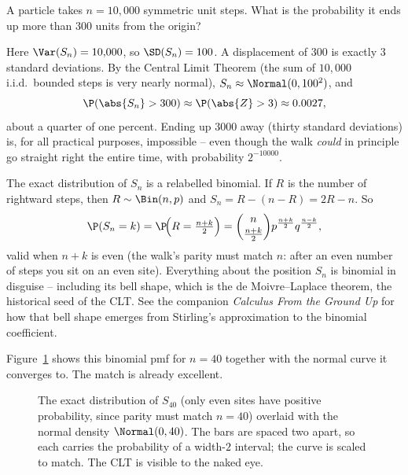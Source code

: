 \begin{example}
\label{ch26:ex-howfar}
A particle takes $n = 10{,}000$ symmetric unit steps. What is the probability
it ends up more than $300$ units from the origin?

Here $\Var(S_n) = 10{,}000$, so $\SD(S_n) = 100$. A displacement of $300$ is
exactly $3$ standard deviations. By the Central Limit Theorem (the sum of
$10{,}000$ i.i.d.\ bounded steps is very nearly normal), $S_n \approx
\Normal(0, 100^2)$, and
\[
  \P(\abs{S_n} > 300) \approx \P(\abs{Z} > 3) \approx 0.0027,
\]
about a quarter of one percent. Ending up $3000$ away (thirty standard
deviations) is, for all practical purposes, impossible -- even though the walk
\emph{could} in principle go straight right the entire time, with probability
$2^{-10000}$.
\end{example}

\begin{connectionbox}
The exact distribution of $S_n$ is a relabelled binomial. If $R$ is the number
of rightward steps, then $R \sim \Bin(n, p)$ and $S_n = R - (n - R) = 2R - n$.
So
\[
  \P(S_n = k) = \P\!\Big(R = \tfrac{n+k}{2}\Big)
  = \binom{n}{\frac{n+k}{2}} p^{\frac{n+k}{2}} q^{\frac{n-k}{2}},
\]
valid when $n + k$ is even (the walk's parity must match $n$: after an even
number of steps you sit on an even site). Everything about the position $S_n$
is binomial in disguise -- including its bell shape, which is the de
Moivre--Laplace theorem, the historical seed of the CLT. See the companion
\emph{Calculus From the Ground Up} for how that bell shape emerges from
Stirling's approximation to the binomial coefficient.
\end{connectionbox}

Figure~\ref{ch26:fig-pmf} shows this binomial pmf for $n = 40$ together with
the normal curve it converges to. The match is already excellent.

\begin{figure}[H]
\centering
{}
\caption{The exact distribution of $S_{40}$ (only even sites have positive
probability, since parity must match $n=40$) overlaid with the normal density
$\Normal(0,40)$. The bars are spaced two apart, so each carries the
probability of a width-$2$ interval; the curve is scaled to match. The CLT is
visible to the naked eye.}
\label{ch26:fig-pmf}
\end{figure}

